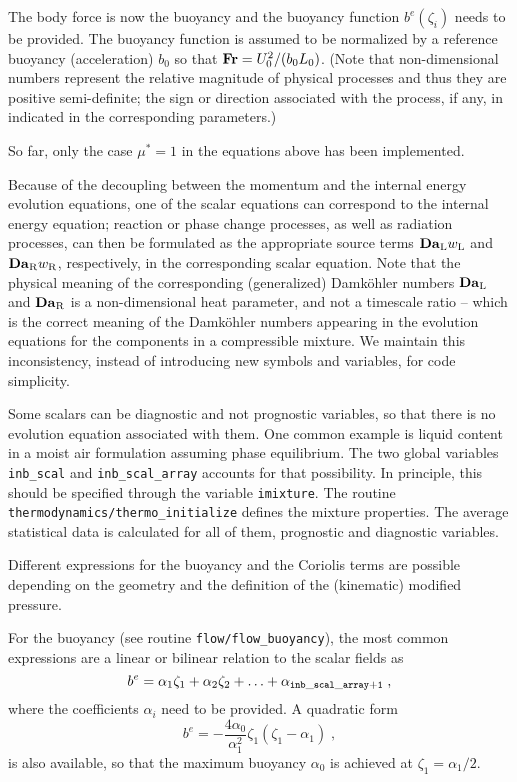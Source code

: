 The body force is now the buoyancy and the buoyancy function $b^e(\zeta_i)$
needs to be provided. The buoyancy function is assumed to be normalized by a
reference buoyancy (acceleration) $b_0$ so that $\mathrm{\bf
  Fr}=U_0^2/(b_0L_0)$. (Note that non-dimensional numbers represent the relative
magnitude of physical processes and thus they are positive semi-definite; the
sign or direction associated with the process, if any, in indicated in the
corresponding parameters.)

So far, only the case $\mu^*=1$ in the equations above has been implemented.

Because of the decoupling between the momentum and the internal energy evolution
equations, one of the scalar equations can correspond to the internal energy
equation; reaction or phase change processes, as well as radiation processes,
can then be formulated as the appropriate source terms $\mathrm{\bf
  Da}_\mathrm{L}w_\mathrm{L}$ and $\mathrm{\bf Da}_\mathrm{R}w_\mathrm{R}$,
respectively, in the corresponding scalar equation. Note that the physical
meaning of the corresponding (generalized) Damk{\"o}hler numbers $\mathrm{\bf
  Da}_\mathrm{L}$ and $\mathrm{\bf Da}_\mathrm{R}$ is a non-dimensional heat
parameter, and not a timescale ratio -- which is the correct meaning of the
Damk{\"o}hler numbers appearing in the evolution equations for the components in
a compressible mixture. We maintain this inconsistency, instead of introducing
new symbols and variables, for code simplicity.

Some scalars can be diagnostic and not prognostic variables, so that there is no
evolution equation associated with them. One common example is liquid content in
a moist air formulation assuming phase equilibrium. The two global variables
{\tt inb\_scal} and {\tt inb\_scal\_array} accounts for that possibility. In
principle, this should be specified through the variable {\tt imixture}. The
routine {\tt thermodynamics/thermo\_initialize} defines the mixture
properties. The average statistical data is calculated for all of them,
prognostic and diagnostic variables.

Different expressions for the buoyancy and the Coriolis terms are possible
depending on the geometry and the definition of the (kinematic) modified
pressure. 

For the buoyancy (see routine {\tt flow/flow\_buoyancy}), the most common
expressions are a linear or bilinear relation to the scalar fields as
\begin{equation}
b^e=\alpha_1\zeta_1+\alpha_2\zeta_2+\ldots+\alpha_\mathrm{\tt inb\_scal\_array+1}\;,
\end{equation}
where the coefficients $\alpha_i$ need to be provided. A quadratic form 
\begin{equation}
b^e=-\frac{4\alpha_0}{\alpha_1^2}\zeta_1(\zeta_1-\alpha_1) \;,
\end{equation}
is also available, so that the maximum buoyancy $\alpha_0$ is achieved at
$\zeta_1=\alpha_1/2$. 


